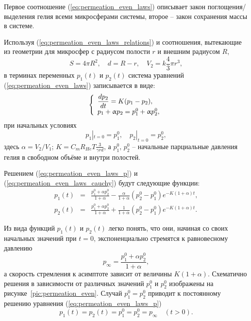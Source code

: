 Первое соотношение (\ref{eq:permeation_even_laws}) описывает закон поглощения/выделения гелия всеми микросферами системы, второе -- закон сохранения массы в системе. 

Используя  (\ref{eq:permeation_even_laws_relations}) и соотношения, вытекающие из геометрии для микросфер с радиусом полости $r$ и внешним радиусом $R$,
\[
S=4\pi R^2,\quad d=R-r,\quad V_2=k\frac{4}{3}\pi r^3,
\]
в терминах переменных $p_1(t)$ и $p_2(t)$ система уравнений (\ref{eq:permeation_even_laws}) записывается в виде:
\begin{equation}
\label{eq:permeation_even_laws_p} 
\left\{
\begin{array}{l}
\displaystyle \frac{dp_2}{dt}  =  K(p_1-p_2), \\
p_1+\upalpha p_2  =  p_1^0 + \upalpha p_2^0, 
\end{array}
\right.
\end{equation}
при начальных условиях
\begin{equation}
\label{eq:permeation_even_laws_cauchy} p_1|_{t=0}=p_1^0,\quad p_2|_{t=0}=p_2^0,
\end{equation}
здесь $\alpha=V_2/V_1$; $K = C_m R_{He} T\displaystyle\frac{3}{\gamma rd}$, а $p_1^0$, $p_2^0$ -- начальные парциальные давления гелия в свободном объёме и внутри полостей. 

Решением (\ref{eq:permeation_even_laws_p}) и (\ref{eq:permeation_even_laws_cauchy}) будут следующие функции:
\begin{eqnarray}
\label{eq:permeation_even_p1}
p_1(t) & = & \frac{p_1^0 + \alpha p_2^0}{1+\alpha} - \frac{\alpha}{1+\alpha}(p_2^0-p_1^0)e^{-K(1+\alpha)t}, \\
\label{eq:permeation_even_p2}
p_2(t) & = & \frac{p_1^0 + \alpha p_2^0}{1+\alpha} + \frac{1}{1+\alpha}(p_2^0-p_1^0)e^{-K(1+\alpha)t}.
\end{eqnarray}

Из вида функций $p_1(t)$ и $p_2(t)$ легко понять, что они, начиная со своих начальных значений при $t=0$, экспоненциально стремятся к равновесному давлению 
\begin{equation}
\label{eq:permeation_even_pinfty}
p_\infty=\displaystyle\frac{p_1^0 + \alpha p_2^0}{1+\alpha},
\end{equation}
а скорость стремления к асимптоте зависит от величины $K(1+\alpha)$. Схематично решения в зависимости от различных значений $p_1^0$ и $p_2^0$ изображены на рисунке~\ref{pic:permeation_even}. Случай $p_1^0=p_2^0$ приводит к постоянному решению уравнения (\ref{eq:permeation_even_laws_p}) 
\[
p_1(t)=p_2(t)=p_1^0=p_2^0=p_\infty\quad (t>0).
\]



